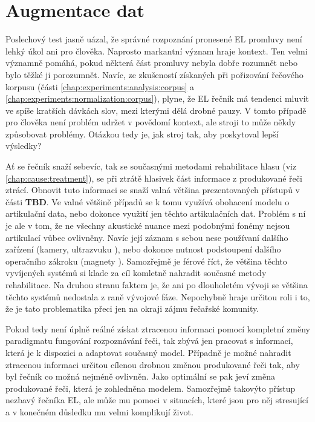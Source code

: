 \section{Augmentace dat}
\label{chap:experiments:augmentation}

Poslechový test jasně uázal, že správné rozpoznání pronesené EL promluvy není lehký úkol ani pro člověka. Naprosto markantní význam hraje kontext. Ten velmi významně pomáhá, pokud některá část promluvy nebyla dobře rozumnět nebo bylo těžké ji porozumnět. Navíc, ze zkušeností získaných při pořizování řečového korpusu (části \ref{chap:experiments:analysis:corpus} a \ref{chap:experiments:normalization:corpus}), plyne, že EL řečník má tendenci mluvit ve spíše kratších dávkách slov, mezi kterými dělá drobné pauzy. V tomto případě pro člověka není problém udržet v povědomí kontext, ale stroji to může někdy způsobovat problémy. Otázkou tedy je, jak  stroj tak, aby poskytoval lepší výsledky?

Ať se řečník snaží sebevíc, tak se současnými metodami rehabilitace hlasu (viz \ref{chap:cause:treatment}), se při ztrátě hlasivek část informace z produkované řeči ztrácí. Obnovit tuto informaci se snaží valná většina prezentovaných přístupů v části \textbf{TBD}. Ve valné většině případů se k tomu využívá obohacení modelu o artikulační data, nebo dokonce využití jen těchto artikulačních dat. \cite{Denby2010} \cite{Hofe2013} Problém s ní je ale v tom, že ne všechny akustické nuance mezi podobnými fonémy nejsou artikulací vůbec ovlivněny. Navíc její záznam s sebou nese používaní dalšího zařízení (kamery, ultrazvuku \cite{Hueber2010}), nebo dokonce nutnost podstoupení dalšího operačního zákroku (magnety \cite{Hofe2011}). Samozřejmě je férové říct, že většina těchto vyvíjených systémů si klade za cíl komletně nahradit současné metody rehabilitace. Na druhou stranu faktem je, že ani po dlouholetém vývoji se většina těchto systémů nedostala z raně vývojové fáze. Nepochybně hraje určitou roli i to, že je tato problematika přeci jen na okraji zájmu řečařské komunity.

Pokud tedy není úplně reálné získat ztracenou informaci pomocí kompletní změny paradigmatu fungování rozpoznávání řeči, tak zbývá jen pracovat s informací, která je k dispozici a adaptovat současný model. Případně je možné nahradit ztracenou informaci určitou cílenou drobnou změnou produkované řeči tak, aby byl řečník co možná nejméně ovlivněn. Jako optimální se pak jeví změna produkované řeči, která je zohledněna modelem. Samozřejmě takovýto přístup nezbavý řečníka EL, ale může mu pomoci v situacích, které jsou pro něj stresující a v konečném důsledku mu velmi komplikují život.

